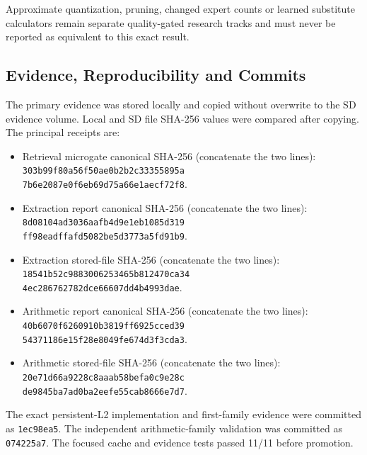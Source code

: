 Approximate quantization, pruning, changed expert counts or learned substitute
calculators remain separate quality-gated research tracks and must never be
reported as equivalent to this exact result.

\subsection{Evidence, Reproducibility and Commits}

The primary evidence was stored locally and copied without overwrite to the SD
evidence volume.  Local and SD file SHA-256 values were compared after copying.
The principal receipts are:

\begin{itemize}
  \item Retrieval microgate canonical SHA-256 (concatenate the two lines):\\
  {\small\texttt{303b99f80a56f50ae0b2b2c33355895a}}\\
  {\small\texttt{7b6e2087e0f6eb69d75a66e1aecf72f8}}.
  \item Extraction report canonical SHA-256 (concatenate the two lines):\\
  {\small\texttt{8d08104ad3036aafb4d9e1eb1085d319}}\\
  {\small\texttt{ff98eadffafd5082be5d3773a5fd91b9}}.
  \item Extraction stored-file SHA-256 (concatenate the two lines):\\
  {\small\texttt{18541b52c9883006253465b812470ca34}}\\
  {\small\texttt{4ec286762782dce66607dd4b4993dae}}.
  \item Arithmetic report canonical SHA-256 (concatenate the two lines):\\
  {\small\texttt{40b6070f6260910b3819ff6925cced39}}\\
  {\small\texttt{54371186e15f28e8049fe674d3f3cda3}}.
  \item Arithmetic stored-file SHA-256 (concatenate the two lines):\\
  {\small\texttt{20e71d66a9228c8aaab58befa0c9e28c}}\\
  {\small\texttt{de9845ba7ad0ba2eefe55cab8666e7d7}}.
\end{itemize}

The exact persistent-L2 implementation and first-family evidence were committed
as \texttt{1ec98ea5}.  The independent arithmetic-family validation was
committed as \texttt{074225a7}.  The focused cache and evidence tests passed
11/11 before promotion.


